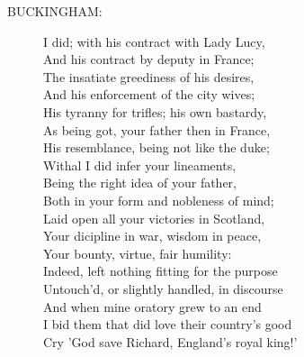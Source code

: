 \documentclass{article}
\begin{document}
\begin{description}
\item[BUCKINGHAM:] 
\hspace{1pt}I did; with his contract with Lady Lucy,\\
\hspace{1pt}And his contract by deputy in France;\\
\hspace{1pt}The insatiate greediness of his desires,\\
\hspace{1pt}And his enforcement of the city wives;\\
\hspace{1pt}His tyranny for trifles; his own bastardy,\\
\hspace{1pt}As being got, your father then in France,\\
\hspace{1pt}His resemblance, being not like the duke;\\
\hspace{1pt}Withal I did infer your lineaments,\\
\hspace{1pt}Being the right idea of your father,\\
\hspace{1pt}Both in your form and nobleness of mind;\\
\hspace{1pt}Laid open all your victories in Scotland,\\
\hspace{1pt}Your dicipline in war, wisdom in peace,\\
\hspace{1pt}Your bounty, virtue, fair humility:\\
\hspace{1pt}Indeed, left nothing fitting for the purpose\\
\hspace{1pt}Untouch'd, or slightly handled, in discourse\\
\hspace{1pt}And when mine oratory grew to an end\\
\hspace{1pt}I bid them that did love their country's good\\
\hspace{1pt}Cry 'God save Richard, England's royal king!'\\
\end{description}
\end{document}
